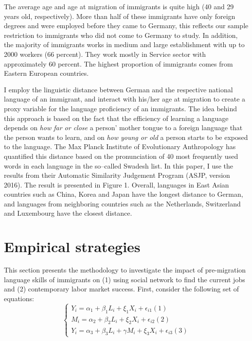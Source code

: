 \documentclass[12pt,a4paper]{article}
\begin{document}
The average age and age at migration of immigrants is quite high (40 and 29 years old, respectively). More than half of these immigrants have only foreign degrees and were employed before they came to Germany, this reflects our sample restriction to immigrants who did not come to Germany to study. In addition, the majority of immigrants works in medium and large establishment with up to 2000 workers (66 percent). They work mostly in Service sector with approximately 60 percent. The highest proportion of immigrants comes from Eastern European countries.

I employ the linguistic distance between German and the respective national language of an immigrant, and interact with his/her age at migration to create a proxy variable for the language proficiency of an immigrants. The idea behind this approach is based on the fact that the efficiency of learning a language depends on \textit{how far or close} a person' mother tongue to a foreign language that the person wants to learn, and on \textit{how young or old} a person starts to be exposed to the language. The Max Planck Institute of Evolutionary Anthropology has quantified this distance based on the pronunciation of 40 most frequently used words in each language in the so--called Swadesh list. In this paper, I use the results from their Automatic Similarity Judgement Program (ASJP, version 2016). The result is presented in Figure 1. Overall, languages in East Asian countries such as China, Korea and Japan have the longest distance to German, and languages from neighboring countries such as the Netherlands, Switzerland and Luxembourg have the closest distance.

\section{Empirical strategies}

This section presents the methodology to investigate the impact of pre-migration language skills of immigrants on (1) using social network to find the current jobs and (2) contemporary labor market success. First, consider the following set of equations:
$$
\begin{cases} Y_{i} = \alpha_{1} + \beta_{1}L_{i} + \xi_{1}X_{i} + \epsilon_{i1} (1) \\ M_{i} = \alpha_{2} + \beta_{2}L_{i} + \xi_{2}X_{i} + \epsilon_{i2} (2) \\ Y_{i} = \alpha_{3} + \beta_{3}L_{i} + \gamma M_{i} + \xi_{3}X_{i} + \epsilon_{i3} (3)
\end{cases}
$$
\end{document}
